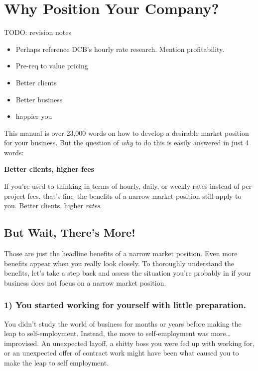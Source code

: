 \chapter{Why Position Your Company?}

TODO: revision notes

\begin{itemize}
\item Perhaps reference DCB’s hourly rate research. Mention profitability.
\item Pre-req to value pricing
\item Better clients
\item Better business
\item happier you
\end{itemize}

This manual is over 23,000 words on how to develop a desirable market position for your business. But the question of \emph{why} to do this is easily answered in just 4 words:

\textbf{Better clients, higher fees}

If you're used to thinking in terms of hourly, daily, or weekly rates instead of per-project fees, that's fine--the benefits of a narrow market position still apply to you. Better clients, higher \emph{rates}.

\section{But Wait, There's More!}

Those are just the headline benefits of a narrow market position. Even more benefits appear when you really look closely. To thoroughly understand the benefits, let's take a step back and assess the situation you're probably in if your business does not focus on a narrow market position.

\subsection{1) \textbf{You started working for yourself with little preparation}.}

You didn't study the world of business for months or years before making the leap to self-employment. Instead, the move to self-employment was more\ldots{} improvised. An unexpected layoff, a shitty boss you were fed up with working for, or an unexpected offer of contract work might have been what caused you to make the leap to self employment.

